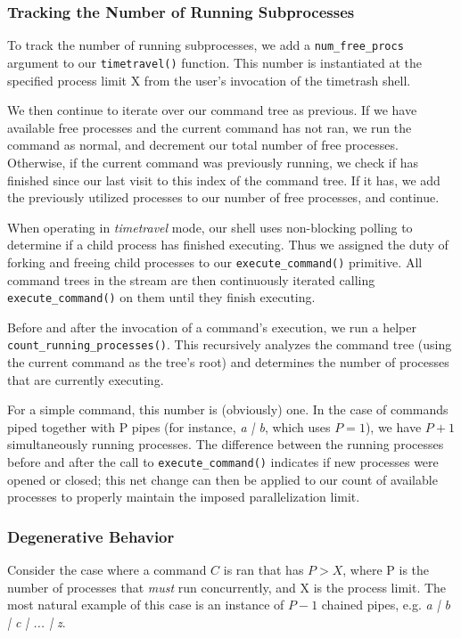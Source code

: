 \documentclass[paper=letter, fontsize=11pt]{scrartcl} %
\begin{document}
\subsubsection{Tracking the Number of Running Subprocesses}
To track the number of running subprocesses, we add a \texttt{num\_free\_procs} argument to our \texttt{timetravel()} function. This number is instantiated at the specified process limit X from the user's invocation of the timetrash shell.

We then continue to iterate over our command tree as previous. If we have available free processes and the current command has not ran, we run the command as normal, and decrement our total number of free processes. Otherwise, if the current command was previously running, we check if has finished since our last visit to this index of the command tree. If it has, we add the previously utilized processes to our number of free processes, and continue.

When operating in \emph{timetravel} mode, our shell uses non-blocking polling to determine if a child process has finished executing. Thus we assigned the duty of forking and freeing child processes to our \texttt{execute\_command()} primitive. All command trees in the stream are then continuously iterated calling \texttt{execute\_command()} on them until they finish executing.

Before and after the invocation of a command's execution, we run a helper \texttt{count\_running\_processes()}. This recursively analyzes the command tree (using the current command as the tree's root) and determines the number of processes that are currently executing.

For a simple command, this number is (obviously) one. In the case of commands piped together with P pipes (for instance, \emph{a | b}, which uses $P = 1$), we have $P + 1$ simultaneously running processes. The difference between the running processes before and after the call to \texttt{execute\_command()} indicates if new processes were opened or closed; this net change can then be applied to our count of available processes to properly maintain the imposed parallelization limit.

\subsubsection{Degenerative Behavior}
Consider the case where a command $C$ is ran that has $P > X$, where P is the number of processes that \emph{must} run concurrently, and X is the process limit. The most natural example of this case is an instance of $P - 1$ chained pipes, e.g. \emph{a | b | c | ... | z}.
\end{document}
